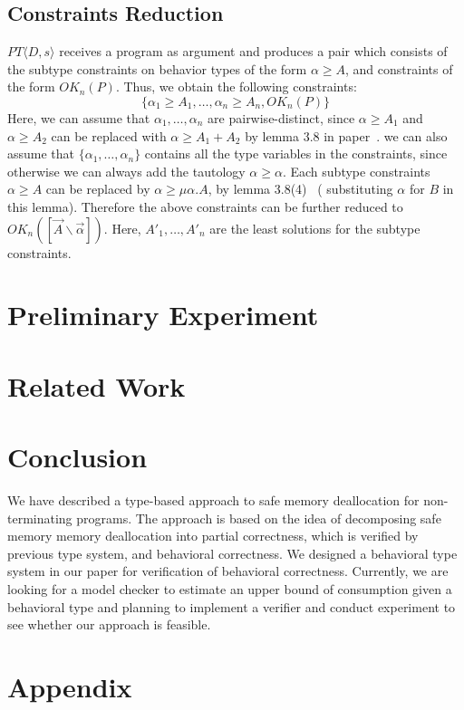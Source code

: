 \documentclass[english]{jssst_ppl} %
\theoremstyle{definition}
\begin{document}
\subsection{Constraints Reduction}
$PT\langle D, s \rangle$ receives a program as argument and produces a pair which consists of the subtype constraints on behavior types of the form $\alpha \ge A$, and constraints of the form $OK_{n}(P)$. Thus, we obtain the following constraints:\\
$$
\{ \alpha_{1} \ge A_{1}, \dots, \alpha_{n} \ge  A_{n}, OK_{n}(P)\}
$$
Here, we can assume that $\alpha_{1}, \dots, \alpha_{n}$ are pairwise-distinct, since $\alpha \ge A_{1}$ and $\alpha \ge A_{2}$ can be replaced with $\alpha \ge A_{1}+A_{2}$ by lemma 3.8 in paper~\cite{DBLP:journals/lmcs/KobayashiSW06}. we can also assume that $\{ \alpha_{1}, \dots, \alpha_{n} \}$ contains all the type variables in the constraints, since otherwise we can always add the tautology $\alpha \ge \alpha$. Each subtype constraints $\alpha \ge A$ can be replaced by $\alpha \ge \mu \alpha. A$, by lemma 3.8(4)~\cite{DBLP:journals/lmcs/KobayashiSW06} ( substituting $\alpha$ for $B$ in this lemma). Therefore the above constraints can be further reduced to $OK_{n}([\vec{A} \backslash \vec{\alpha}])$. Here, $A'_{1}, \dots, A'_{n}$ are the least solutions for the subtype constraints.

\section{Preliminary Experiment}

\section{Related Work}

\section{Conclusion}

We have described a type-based approach to safe memory deallocation
for non-terminating programs. The approach is based on the idea of
decomposing safe memory memory deallocation into partial correctness,
which is verified by previous type system, and behavioral
correctness. We designed a behavioral type system in our paper for
verification of behavioral correctness. Currently, we are looking for
a model checker to estimate an upper bound of consumption given a
behavioral type and planning to implement a verifier and conduct
experiment to see whether our approach is feasible.




\newpage
\appendix
\section*{Appendix}



\end{document}
